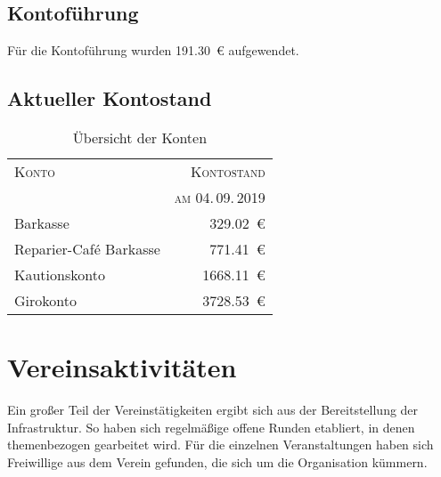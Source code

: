 \documentclass[ngerman]{scrartcl}
\begin{document}
\subsection{Kontoführung}
\label{sec:Kontoführung}
Für die Kontoführung wurden \num{191,30}~\euro{} aufgewendet.

\subsection{Aktueller Kontostand}

\begin{table}[h!]
        \centering{}
        \begin{tabular}{l|r}
        \toprule
        \textsc{Konto} & \textsc{Kontostand} \\
        & \textsc{am 04.\,09.\,2019} \\
        \midrule
        Barkasse & \num{329,02}~\euro{} \\
        Reparier-Café Barkasse & \num{771,41}~\euro{} \\
        Kautionskonto & \num{1668,11}~\euro{} \\
        Girokonto & \num{3728,53}~\euro{}\\
        \bottomrule
        \end{tabular}
\caption{Übersicht der Konten}
\end{table}

\newpage
\section{Vereinsaktivitäten}

Ein großer Teil der Vereinstätigkeiten ergibt sich aus der
Bereitstellung der Infrastruktur. So haben sich regelmäßige offene Runden
etabliert, in denen themenbezogen gearbeitet wird. Für die
einzelnen Veranstaltungen haben sich Freiwillige aus dem Verein
gefunden, die sich um die Organisation kümmern.
\end{document}
